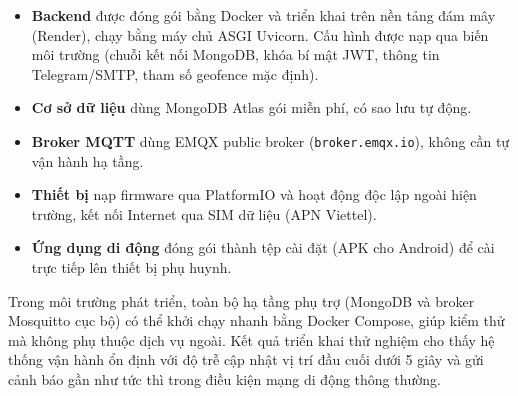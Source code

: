 \documentclass[../DoAn.tex]{subfiles}
\begin{document}
\begin{itemize}
    \item \textbf{Backend} được đóng gói bằng Docker và triển khai trên nền tảng đám mây (Render), chạy bằng máy chủ ASGI Uvicorn. Cấu hình được nạp qua biến môi trường (chuỗi kết nối MongoDB, khóa bí mật JWT, thông tin Telegram/SMTP, tham số geofence mặc định).
    \item \textbf{Cơ sở dữ liệu} dùng MongoDB Atlas gói miễn phí, có sao lưu tự động.
    \item \textbf{Broker MQTT} dùng EMQX public broker (\texttt{broker.emqx.io}), không cần tự vận hành hạ tầng.
    \item \textbf{Thiết bị} nạp firmware qua PlatformIO và hoạt động độc lập ngoài hiện trường, kết nối Internet qua SIM dữ liệu (APN Viettel).
    \item \textbf{Ứng dụng di động} đóng gói thành tệp cài đặt (APK cho Android) để cài trực tiếp lên thiết bị phụ huynh.
\end{itemize}

Trong môi trường phát triển, toàn bộ hạ tầng phụ trợ (MongoDB và broker Mosquitto cục bộ) có thể khởi chạy nhanh bằng Docker Compose, giúp kiểm thử mà không phụ thuộc dịch vụ ngoài. Kết quả triển khai thử nghiệm cho thấy hệ thống vận hành ổn định với độ trễ cập nhật vị trí đầu cuối dưới 5 giây và gửi cảnh báo gần như tức thì trong điều kiện mạng di động thông thường.
\end{document}
